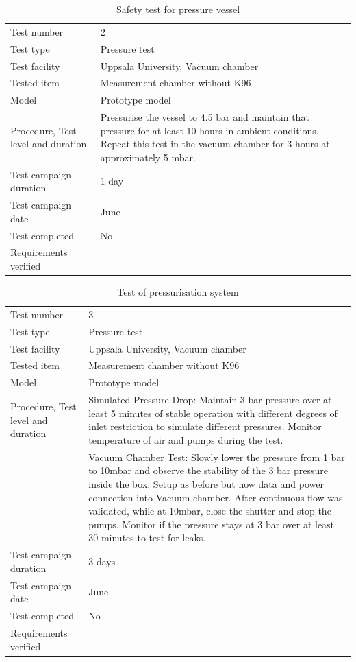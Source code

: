\begin{table}[H]
\centering
\caption{Safety test for pressure vessel}
\label{tab:pressure_safety}
\begin{tabular}{L{5cm}L{10cm}}
\toprule
Test number & 2 \\
Test type & Pressure test \\
Test facility & Uppsala University, Vacuum chamber \\
Tested item & Measurement chamber without K96\\
Model & Prototype model \\
Procedure, Test level and duration & Pressurise the vessel to 4.5 bar and maintain that pressure for at least 10 hours in ambient conditions. Repeat this test in the vacuum chamber for 3 hours at approximately 5 mbar.  \\
Test campaign duration & 1 day \\
Test campaign date & June \\
Test completed & No \\
Requirements verified & \\
\bottomrule
\end{tabular}
\end{table}

\begin{table}[H]
\centering
\caption{Test of pressurisation system}
\label{tab:test_pressurisation_system}
\begin{tabular}{L{5cm}L{10cm}}
\toprule
Test number & 3 \\
Test type & Pressure test \\
Test facility & Uppsala University, Vacuum chamber \\
Tested item & Measurement chamber without K96\\
Model & Prototype model \\
Procedure, Test level and duration & Simulated Pressure Drop: Maintain 3 bar pressure over at least 5 minutes of stable operation with different degrees of inlet restriction to simulate different pressures. Monitor temperature of air and pumps during the test. \\
&Vacuum Chamber Test: Slowly lower the pressure from 1 bar to 10mbar and observe the stability of the 3 bar pressure inside the box. Setup as before but now data and power connection into Vacuum chamber. After continuous flow was validated, while at 10mbar, close the shutter and stop the pumps. Monitor if the pressure stays at 3 bar over at least 30 minutes to test for leaks.
  \\
Test campaign duration & 3 days \\
Test campaign date & June \\
Test completed & No \\
Requirements verified & \\
\bottomrule
\end{tabular}
\end{table}


